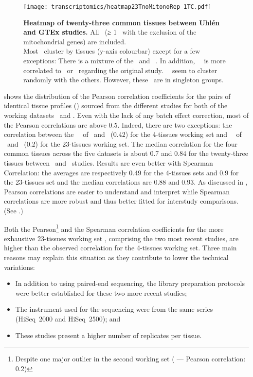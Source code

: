 \begin{figure}[!htpb]
    \texttt{[image: transcriptomics/heatmap23TnoMitonoRep\_1TC.pdf]}\centering
    \caption[Heatmap of 23 common tissues between Uhlén and GTEx studies]%
    {\label{fig:noMitoNoRep23T}%
    \textbf{Heatmap of twenty-three common tissues between Uhlén and GTEx studies.}
    All \pcgs\ (≥ 1 \FPKM\ with the exclusion of the mitochondrial
    genes) are included.\\Most \treps\ cluster by tissues (y-axis colourbar)
    except for a few exceptions:
    There is a mixture of the \fallopian\
    and \Ovary\ \treps.
    In addition, \Salivary\ \treps\ is more correlated to
    \Esophagus\ or \Stomach\ regarding the original study.
    \Bladder\ \treps\ seem to cluster randomly with the others.
    However, these \treps\ are in singleton groups.}
\end{figure}

 shows the distribution of the Pearson correlation
coefficients for the pairs of identical tissue profiles (\treps)
sourced from the different studies
for both of the working datasets \setOne\ and \setTwo.
Even with the lack of any batch effect correction,
most of the Pearson correlations are above 0.5.
Indeed,
there are two exceptions: the
correlation between the \Testis\ \treps\ of \castle\ and \vt\ (0.42)
for the 4-tissues working set and
\Salivary\ \treps\ of \uhlen\ and \gtex\ (0.2)
for the 23-tissues working set.
The median correlation for the four common tissues across the five datasets is
about 0.7 and 0.84 for the twenty-three tissues between \uhlen\ and \gtex\ studies.
Results are even better with Spearman Correlation:
the averages are respectively 0.49 for the 4-tissues sets
and 0.9 for the 23-tissues set and
the median correlations are 0.88 and 0.93.
As discussed in ,
Pearson correlations are easier to understand and interpret
while Spearman correlations are more robust and thus better fitted for interstudy
comparisons.
(See .)\mybr\

Both\label{seg:betterTreps} the
Pearson\footnote{Despite one major outlier in the second
working set ( --- Pearson correlation: 0.2)} and the
Spearman correlation coefficients for the more exhaustive 23-tissues working set
\setTwo,
comprising the two most recent studies,
are higher than the observed correlation for the 4-tissues working set.
Three main reasons may explain this situation as they contribute to lower
the technical variations:\mybr\
\vspace{-3mm}
\begin{itemize}[topsep=0pt,nosep]
    \item In addition to using paired-end sequencing,
        the library preparation protocols were better established
        for these two more recent studies;
    \item The instrument used for the sequencing were
        from the same series (HiSeq~2000 and HiSeq~2500); and
    \item These studies present a higher number of replicates per tissue.
\end{itemize}

